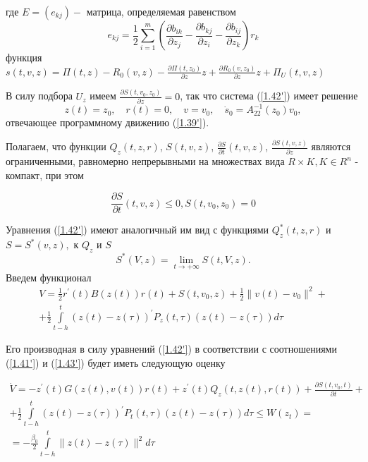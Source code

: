 где $E = (e_{kj}) - $ матрица, определяемая равенством 
$$e_{kj} = \frac12 \sum_{ i = 1}^{m} (\frac{\partial b_{ik}}{\partial z_j} - \frac{\partial b_{kj}}{\partial z_i} - \frac{\partial b_{ij}}{\partial z_k}) r_k$$
функция $s(t, v, z) = \Pi (t, z) - R_0 (v, z) - \frac{\partial \Pi (t, z_0)}{\partial z} z + \frac{\partial R_0 (v, z_0)}{\partial z} z + \Pi_U (t, v, z)$

В силу подбора $U_z$ имеем $\frac{\partial S(t, v_0, z_0)}{\partial z} = 0$, так что система (\ref{1.42'}) имеет решение 
$$z(t) = z_0, \quad r(t) = 0, \quad v = v_0, \quad \dot s_0 = A_{22}^{-1} (z_0) v_0,$$ 
отвечающее программному движению (\ref{1.39'}).

Полагаем, что функции $Q_z (t, z, r)$, $S(t, v, z)$, $\frac{\partial S}{\partial t} (t, v, z)$, $\frac{\partial S(t, v, z)}{\partial z}$ являются ограниченными, равномерно непрерывными на множествах вида $R \times K, K \in R^n$ - компакт, при этом

\begin{equation} \label{1.43'}
\frac{\partial S}{\partial t} (t, v, z) \le 0, S(t, v_0, z_0) = 0
\end{equation}

Уравнения (\ref{1.42'}) имеют аналогичный им вид с функциями $Q_z^{*} (t, z, r)$ и $S = S^{*} (v, z),$ к $Q_z$ и $S$
$$S^{*} (V, z) = \lim_{t \to + \infty} S(t, V, z).$$
Введем функционал
$$
\begin{array}{c}
\displaystyle V = \frac12 r^{'}(t) B (z(t)) r(t) + S(t, v_0, z) + \frac12 \| v(t) - v_0 \|^2 +\\
\displaystyle + \frac12 \int\limits_{t - h}^{t} (z(t) - z(\tau))^{'} P_z (t, \tau) (z(t) - z(\tau)) d \tau
\end{array}
$$

Его производная в силу уравнений (\ref{1.42'}) в соответствии с соотношениями (\ref{1.41'}) и (\ref{1.43'}) будет иметь следующую оценку

\begin{equation} \label{1.44'}
\begin{array}{c}
\displaystyle \dot V = - z^{'} (t) G(z(t), v(t)) r(t) + z^{'} (t) Q_z (t, z(t), r(t)) + \frac{\partial S(t, v_0, t)}{\partial t} +\\
\displaystyle + \frac12 \displaystyle\int\limits_{t - h}^{t} (z(t) - z(\tau))^{'} P_t(t, \tau) (z(t) - z(\tau)) d \tau \le W(z_t) =\\
\displaystyle = -\frac{\beta_0}{2} \displaystyle\int\limits_{t - h}^{t} \| z(t) - z(\tau) \|^2 d \tau
\end{array}
\end{equation}

